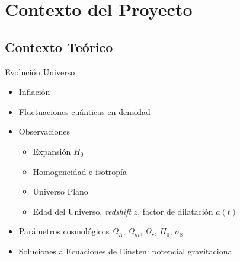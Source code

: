 \documentclass{beamer}
\begin{document}
\section{Contexto del Proyecto}
\subsection{Contexto Teórico}
\begin{frame}{Evolución Universo}
	\begin{block}{}
		\begin{itemize}
			\item Inflación
			\item Fluctuaciones cuánticas en densidad
			\item Observaciones
			\begin{itemize}
				\item Expansión $H_0$
				\item Homogeneidad e isotropía
				\item Universo Plano
				\item Edad del Universo, \textit{redshift} $z$, factor de dilatación $a(t)$
			\end{itemize}
			\item Parámetros cosmológicos $\Omega_\Lambda$, $\Omega_m$, $\Omega_r$,  $H_0$, $\sigma_8$
			\item Soluciones a Ecuaciones de Einsten: potencial gravitacional 
		\end{itemize}
	\end{block}
\end{frame}
\end{document}
